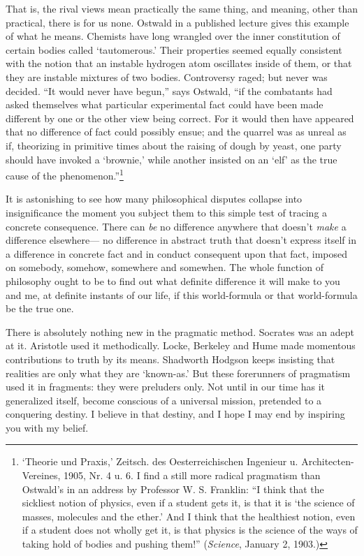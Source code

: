 \documentclass[]{article}
\begin{document}
That is, the rival views mean practically the same thing, and meaning,
other than practical, there is for us none. Ostwald in a published
lecture gives this example of what he means. Chemists have long wrangled
over the inner constitution of certain bodies called `tautomerous.'
Their properties seemed equally consistent with the notion that an
instable hydrogen atom oscillates inside of them, or that they are
instable mixtures of two bodies. Controversy raged; but never was
decided. ``It would never have begun,'' says Ostwald, ``if the combatants
had asked themselves what particular experimental fact could have been
made different by one or the other view being correct. For it would then
have appeared that no difference of fact could possibly ensue; and the
quarrel was as unreal as if, theorizing in primitive times about the
raising of dough by yeast, one party should have invoked a `brownie,'
while another insisted on an `elf' as the true cause of the phenomenon.''\footnote{`Theorie und Praxis,' Zeitsch. des Oesterreichischen
Ingenieur u. Architecten-Vereines, 1905, Nr. 4 u. 6. I find a still
more radical pragmatism than Ostwald's in an address by Professor W.
S. Franklin: ``I think that the sickliest notion of physics, even if a
student gets it, is that it is `the science of masses, molecules and the
ether.' And I think that the healthiest notion, even if a student does
not wholly get it, is that physics is the science of the ways of taking
hold of bodies and pushing them!'' (\emph{Science}, January 2, 1903.)}

It is astonishing to see how many philosophical disputes collapse
into insignificance the moment you subject them to this simple test of
tracing a concrete consequence. There can \emph{be} no difference anywhere
that doesn't \emph{make} a difference elsewhere--- no difference in abstract
truth that doesn't express itself in a difference in concrete fact and
in conduct consequent upon that fact, imposed on somebody, somehow,
somewhere and somewhen. The whole function of philosophy ought to be
to find out what definite difference it will make to you and me,
at definite instants of our life, if this world-formula or that
world-formula be the true one.

There is absolutely nothing new in the pragmatic method. Socrates was
an adept at it. Aristotle used it methodically. Locke, Berkeley and Hume
made momentous contributions to truth by its means. Shadworth Hodgson
keeps insisting that realities are only what they are `known-as.'
But these forerunners of pragmatism used it in fragments: they were
preluders only. Not until in our time has it generalized itself, become
conscious of a universal mission, pretended to a conquering destiny. I
believe in that destiny, and I hope I may end by inspiring you with my
belief.
\end{document}
